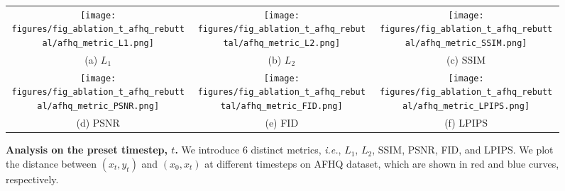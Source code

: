 \begin{figure*}[tp]
\centering
\begin{tabular}{ccc}
\begin{minipage}[t]{0.3\linewidth}\texttt{[image: figures/fig\_ablation\_t\_afhq\_rebuttal/afhq\_metric\_L1.png]}\end{minipage} &
\begin{minipage}[t]{0.3\linewidth}\texttt{[image: figures/fig\_ablation\_t\_afhq\_rebuttal/afhq\_metric\_L2.png]}\end{minipage} &
\begin{minipage}[t]{0.3\linewidth}\texttt{[image: figures/fig\_ablation\_t\_afhq\_rebuttal/afhq\_metric\_SSIM.png]}\end{minipage} \\
(a) $L_1$ & (b) $L_2$ & (c) SSIM \\
\begin{minipage}[t]{0.3\linewidth}\texttt{[image: figures/fig\_ablation\_t\_afhq\_rebuttal/afhq\_metric\_PSNR.png]}\end{minipage} &
\begin{minipage}[t]{0.3\linewidth}\texttt{[image: figures/fig\_ablation\_t\_afhq\_rebuttal/afhq\_metric\_FID.png]}\end{minipage} &
\begin{minipage}[t]{0.3\linewidth}\texttt{[image: figures/fig\_ablation\_t\_afhq\_rebuttal/afhq\_metric\_LPIPS.png]}\end{minipage} \\
(d) PSNR & (e) FID & (f) LPIPS
\end{tabular}
\caption{
    \textbf{Analysis on the preset timestep, $t$.}
    We introduce 6 distinct metrics, \textit{i.e.}, $L_1$, $L_2$, SSIM, PSNR, FID, and LPIPS.
    We plot the distance between $(x_t,y_t)$ and $(x_0, x_t)$ at different timesteps on AFHQ dataset, which are shown in red and blue curves, respectively.
}
\label{fig:ablation_t_afhq}
\vspace{-10pt}
\end{figure*}

